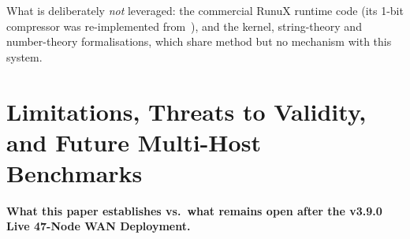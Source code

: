 \documentclass[11pt,a4paper]{article}
\begin{document}
What is deliberately \emph{not} leveraged: the commercial RunuX runtime code (its 1-bit compressor was re-implemented from~\cite{bernstein2018signsgd}), and the kernel, string-theory and number-theory formalisations, which share method but no mechanism with this system.

\section{Limitations, Threats to Validity, and Future Multi-Host Benchmarks}
\label{sec:limitations}

\textbf{What this paper establishes vs.\ what remains open after the v3.9.0 Live 47-Node WAN Deployment.}
\end{document}
